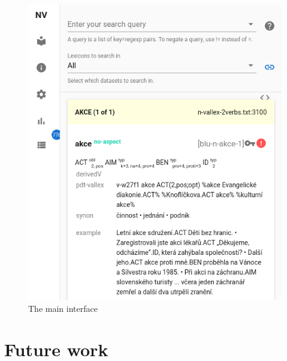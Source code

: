 \documentclass[10pt, a4paper, twocolumn]{article} %
\begin{document}
\begin{figure}
    \includegraphics[width=\hsize]{images/ui-main.png}
    \caption{The main interface}
\end{figure}




\section{Future work}




\printbibliography[title={Bibliography}] %

\end{document}
